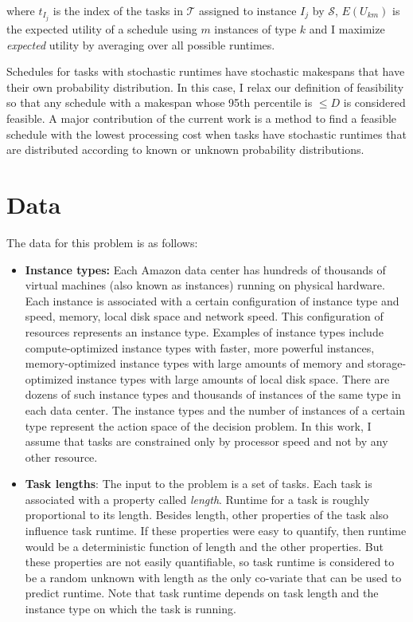 \documentclass[12pt]{report}
\begin{document}
where $t_{I_j}$ is the index of the tasks in $\mathcal{T}$ assigned to instance $I_j$ by $\mathcal{S}$, $E(U_{km})$ is the expected utility of a schedule using $m$ instances of type $k$ and I maximize \textit{expected} utility by averaging over all possible runtimes.

Schedules for tasks with stochastic runtimes have stochastic makespans that have their own probability distribution. In this case, I relax our definition of feasibility so that any schedule with a makespan whose 95th percentile is $\le D$ is considered feasible. A major contribution of the current work is a method to find a feasible schedule with the lowest processing cost when tasks have stochastic runtimes that are distributed according to known or unknown probability distributions.

\section{Data}

\label{Data}
The data for this problem is as follows:

\begin{itemize}
\item \textbf{Instance types:}
Each Amazon data center has hundreds of thousands of virtual machines  (also known as instances) \cite{AWS:EC2} running on physical hardware.
Each instance is associated with a certain configuration of instance type and speed, memory, local disk space and network speed.
This configuration of resources represents an instance type.
Examples of instance types include compute-optimized instance types with faster, more powerful instances, memory-optimized instance types with large amounts of memory and storage-optimized instance types with large amounts of local disk space.
There are dozens of such instance types and thousands of instances of the same type in each data center.
The instance types and the number of instances of a certain type represent the action space of the decision problem.
In this work, I assume that tasks are constrained only by processor speed and not by any other resource.

\item \textbf{Task lengths}:
The input to the problem is a set of tasks.
Each task is associated with a property called \textit{length}.
Runtime for a task is roughly proportional to its length.
Besides length, other properties of the task also influence task runtime.
If these properties were easy to quantify, then runtime would be a deterministic function of length and the other properties.
But these properties are not easily quantifiable, so task runtime is considered to be a random unknown with length as the only co-variate that can be used to predict runtime.
Note that task runtime depends on task length and the instance type on which the task is running.

\end{itemize}
\end{document}
